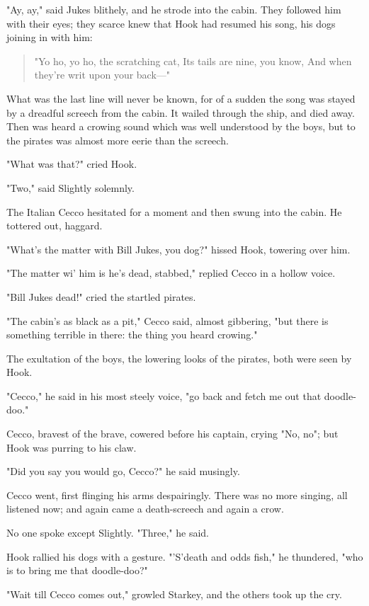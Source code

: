 "Ay, ay," said Jukes blithely, and he strode into the cabin. They followed
him with their eyes; they scarce knew that Hook had resumed his song, his
dogs joining in with him:

\begin{verse}
"Yo ho, yo ho, the scratching cat,
Its tails are nine, you know,
And when they're writ upon your back—"
\end{verse}

What was the last line will never be known, for of a sudden the song was
stayed by a dreadful screech from the cabin. It wailed through the ship,
and died away. Then was heard a crowing sound which was well understood by
the boys, but to the pirates was almost more eerie than the screech.


"What was that?" cried Hook.


"Two," said Slightly solemnly.


The Italian Cecco hesitated for a moment and then swung into the cabin. He
tottered out, haggard.


"What's the matter with Bill Jukes, you dog?" hissed Hook, towering over
him.


"The matter wi' him is he's dead, stabbed," replied Cecco in a hollow
voice.


"Bill Jukes dead!" cried the startled pirates.


"The cabin's as black as a pit," Cecco said, almost gibbering, "but there
is something terrible in there: the thing you heard crowing."


The exultation of the boys, the lowering looks of the pirates, both were
seen by Hook.


"Cecco," he said in his most steely voice, "go back and fetch me out that
doodle-doo."


Cecco, bravest of the brave, cowered before his captain, crying "No, no";
but Hook was purring to his claw.


"Did you say you would go, Cecco?" he said musingly.


Cecco went, first flinging his arms despairingly. There was no more
singing, all listened now; and again came a death-screech and again a
crow.


No one spoke except Slightly. "Three," he said.


Hook rallied his dogs with a gesture. "'S'death and odds fish," he
thundered, "who is to bring me that doodle-doo?"


"Wait till Cecco comes out," growled Starkey, and the others took up the
cry.


